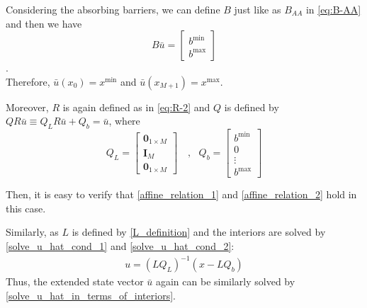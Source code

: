 \documentclass[11pt]{article}
\begin{document}
Considering the absorbing barriers, we can define $B$ just like as $B_{AA}$ in \cref{eq:B-AA} and then we have
\begin{equation}
B\bar{u} = \begin{bmatrix}
b^{\min}\\
b^{\max}
\end{bmatrix}
\end{equation}.\\
Therefore, $\bar{u}(x_0) = x^{\min}$ and $\bar{u}(x_{M+1}) = x^{\max}$.

Moreover, $R$ is again defined as in \cref{eq:R-2} and $Q$ is defined by $Q R\bar{u}\equiv Q_L R\bar{u}+Q_b = \bar{u}$, where
\begin{equation}
Q_L = \begin{bmatrix}
\mathbf{0}_{1\times M} \\
\mathbf{I}_M  \\
\mathbf{0}_{1\times M}
\end{bmatrix}%
\quad, \text{ } Q_b = \begin{bmatrix}
b^{\min}\\
0\\
\vdots\\
b^{\max}
\end{bmatrix}%
\end{equation}

Then, it is easy to verify that \cref{affine_relation_1} and \cref{affine_relation_2} hold in this case.



Similarly, as $L$ is defined by \cref{L_definition} and the interiors are solved by \cref{solve_u_hat_cond_1} and \cref{solve_u_hat_cond_2}:
\begin{align}
u = (L Q_L)^{-1}(x-L Q_b)
\end{align}
Thus, the extended state vector $\bar{u}$ again can be similarly solved by \cref{solve_u_hat_in_terms_of_interiors}.
\end{document}
